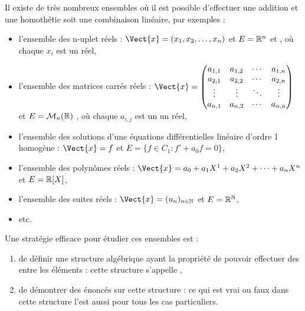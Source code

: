 \documentclass{book}
\begin{document}
\begin{Exemple}[Exemples d'ensembles de vecteurs : \(E=\{\Vect{x}\}\)]
Il existe de très nombreux ensembles  où il est possible d'effectuer une addition et une homothétie soit une combinaison linéaire, par exemples :
\begin{itemize}
\item l'ensemble des n-uplet réels : $\Vect{x}=(x_{1},x_{2},\ldots ,x_{n})$ et $E=\mathbb{R}^n$ et , où chaque $x_{i}$ est un réel,
\item l'ensemble des matrices carrés réels : $\Vect{x}=\begin{pmatrix}
a_{1,1} & a_{1,2} & \cdots & a_{1,n}\\
a_{2,1} & a_{2,2} & \cdots & a_{2,n}\\
\vdots & \vdots & \ddots & \vdots\\
a_{n,1} & a_{n,2} & \cdots & a_{n,n}\\
\end{pmatrix}$ et $E=\mathcal{M}_{n}(\mathbb{R})$ , où  chaque $a_{i,j}$ est un un réel,
\item l'ensemble des solutions d'une équations différentielles linéaire d'ordre 1 homogène : $\Vect{x}=f$  et $E=\{f\in C_1 :  f'+a_{0}f=0\}$,
\item l'ensemble des polynômes réels : $\Vect{x}= a_{0}+a_{1}X^{1}+a_{2}X^{2}+\dots +a_{n}X^{n}$ et $E=\mathbb{R}[X]$,
\item l'ensemble des suites réels : $\Vect{x}=(u_{n})_{n\in \mathbb {N} }$ et $E=\mathbb{R}^{\mathbb{N}}$,
\item etc.
\end{itemize}
\end{Exemple}
Une stratégie efficace pour étudier ces ensembles est :
\begin{enumerate}
\item de définir une structure algébrique ayant la propriété de pouvoir effectuer des  entre les éléments : cette structure s'appelle ,
\item de démontrer des énoncés sur cette structure  : ce qui est vrai ou faux dans cette structure  l'est aussi pour tous les cas particuliers. 
\end{enumerate}

\end{document}

